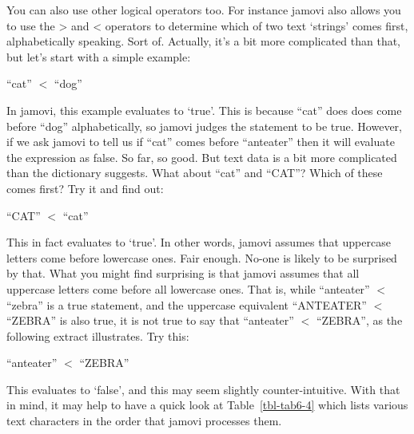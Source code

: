 \documentclass[
  a4paper,
]{book}
\begin{document}
You can also use other logical operators too. For instance jamovi also
allows you to use the \textgreater{} and \textless{} operators to
determine which of two text `strings' comes first, alphabetically
speaking. Sort of. Actually, it's a bit more complicated than that, but
let's start with a simple example:

``cat'' \(<\) ``dog''

In jamovi, this example evaluates to `true'. This is because ``cat''
does does come before ``dog'' alphabetically, so jamovi judges the
statement to be true. However, if we ask jamovi to tell us if ``cat''
comes before ``anteater'' then it will evaluate the expression as false.
So far, so good. But text data is a bit more complicated than the
dictionary suggests. What about ``cat'' and ``CAT''? Which of these
comes first? Try it and find out:

``CAT'' \(<\) ``cat''

This in fact evaluates to `true'. In other words, jamovi assumes that
uppercase letters come before lowercase ones. Fair enough. No-one is
likely to be surprised by that. What you might find surprising is that
jamovi assumes that all uppercase letters come before all lowercase
ones. That is, while ``anteater'' \(<\) ``zebra'' is a true statement,
and the uppercase equivalent ``ANTEATER'' \(<\) ``ZEBRA'' is also true,
it is not true to say that ``anteater'' \(<\) ``ZEBRA'', as the
following extract illustrates. Try this:

``anteater'' \(<\) ``ZEBRA''

This evaluates to `false', and this may seem slightly counter-intuitive.
With that in mind, it may help to have a quick look at
Table~\ref{tbl-tab6-4} which lists various text characters in the order
that jamovi processes them.

\hypertarget{tbl-tab6-4}{}
 
  \providecommand{\huxb}[2]{\arrayrulecolor[RGB]{#1}\global\arrayrulewidth=#2pt}
  \providecommand{\huxvb}[2]{\color[RGB]{#1}\vrule width #2pt}
  \providecommand{\huxtpad}[1]{\rule{0pt}{#1}}
  \providecommand{\huxbpad}[1]{\rule[-#1]{0pt}{#1}}
\end{document}
